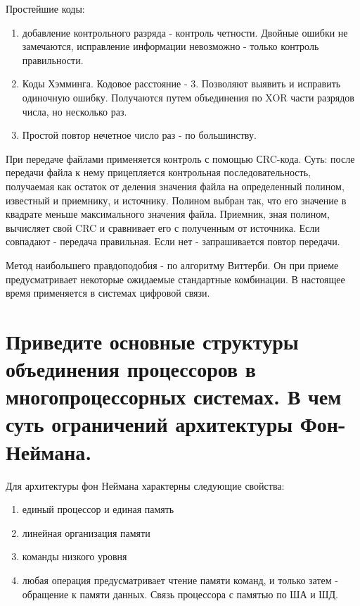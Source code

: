 \documentclass[unicode, 12pt, a4paper, oneside]{article}
\begin{document}
Простейшие коды:
\begin{enumerate}
\item добавление контрольного разряда - контроль четности. Двойные ошибки не замечаются, исправление информации невозможно - только контроль правильности.
\item Коды Хэмминга. Кодовое расстояние - 3. Позволяют выявить и исправить одиночную ошибку. Получаются путем объединения по XOR части разрядов числа, но несколько раз.
\item Простой повтор нечетное число раз - по большинству.
\end{enumerate}

При передаче файлами применяется контроль с помощью СRC-кода. Суть: после передачи файла к нему прицепляется контрольная последовательность, получаемая как остаток от деления значения файла на определенный полином, известный и приемнику, и источнику. Полином выбран так, что его значение в квадрате меньше максимального значения файла. Приемник, зная полином, вычисляет свой CRC и сравнивает его с полученным от источника. Если совпадают - передача правильная. Если нет - запрашивается повтор передачи.

Метод наибольшего правдоподобия - по алгоритму Виттерби. Он при приеме предусматривает некоторые ожидаемые стандартные комбинации. В настоящее время применяется в системах цифровой связи.

\section{Приведите основные структуры объединения процессоров в многопроцессорных системах. В чем суть ограничений архитектуры Фон-Неймана.}

Для архитектуры фон Неймана характерны следующие свойства:
\begin{enumerate}
\item единый процессор и единая память
\item линейная организация памяти
\item команды низкого уровня
\item любая операция предусматривает чтение памяти команд, и только затем - обращение к памяти данных. Связь процессора с памятью по ША и ШД.
\end{enumerate}
\end{document}
